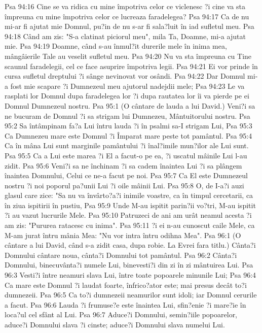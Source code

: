 Psa 94:16  Cine se va ridica cu mine împotriva celor ce viclenesc ?i cine va sta împreuna cu mine împotriva celor ce lucreaza faradelegea?
Psa 94:17  Ca de nu mi-ar fi ajutat mie Domnul, pu?in de nu s-ar fi sala?luit în iad sufletul meu.
Psa 94:18  Când am zis: "S-a clatinat piciorul meu", mila Ta, Doamne, mi-a ajutat mie.
Psa 94:19  Doamne, când s-au înmul?it durerile mele în inima mea, mângâierile Tale au veselit sufletul meu.
Psa 94:20  Nu va sta împreuna cu Tine scaunul faradelegii, cel ce face asuprire împotriva legii.
Psa 94:21  Ei vor prinde în cursa sufletul dreptului ?i sânge nevinovat vor osândi.
Psa 94:22  Dar Domnul mi-a fost mie scapare ?i Dumnezeul meu ajutorul nadejdii mele;
Psa 94:23  Le va rasplati lor Domnul dupa faradelegea lor ?i dupa rautatea lor îi va pierde pe ei Domnul Dumnezeul nostru.
Psa 95:1  (O cântare de lauda a lui David.) Veni?i sa ne bucuram de Domnul ?i sa strigam lui Dumnezeu, Mântuitorului nostru.
Psa 95:2  Sa întâmpinam fa?a Lui întru lauda ?i în psalmi sa-I strigam Lui,
Psa 95:3  Ca Dumnezeu mare este Domnul ?i Împarat mare peste tot pamântul.
Psa 95:4  Ca în mâna Lui sunt marginile pamântului ?i înal?imile mun?ilor ale Lui sunt.
Psa 95:5  Ca a Lui este marea ?i El a facut-o pe ea, ?i uscatul mâinile Lui l-au zidit.
Psa 95:6  Veni?i sa ne închinam ?i sa cadem înaintea Lui ?i sa plângem înaintea Domnului, Celui ce ne-a facut pe noi.
Psa 95:7  Ca El este Dumnezeul nostru ?i noi poporul pa?unii Lui ?i oile mâinii Lui.
Psa 95:8  O, de I-a?i auzi glasul care zice: "Sa nu va învârto?a?i inimile voastre, ca în timpul cercetarii, ca în ziua ispitirii în pustiu,
Psa 95:9  Unde M-au ispitit parin?ii vo?tri, M-au ispitit ?i au vazut lucrurile Mele.
Psa 95:10  Patruzeci de ani am urât neamul acesta ?i am zis: "Pururea ratacesc cu inima".
Psa 95:11  ?i ei n-au cunoscut caile Mele, ca M-am jurat întru mânia Mea: "Nu vor intra întru odihna Mea".
Psa 96:1  (O cântare a lui David, când s-a zidit casa, dupa robie. La Evrei fara titlu.) Cânta?i Domnului cântare noua, cânta?i Domnului tot pamântul.
Psa 96:2  Cânta?i Domnului, binecuvânta?i numele Lui, binevesti?i din zi în zi mântuirea Lui.
Psa 96:3  Vesti?i între neamuri slava Lui, între toate popoarele minunile Lui;
Psa 96:4  Ca mare este Domnul ?i laudat foarte, înfrico?ator este; mai presus decât to?i dumnezeii.
Psa 96:5  Ca to?i dumnezeii neamurilor sunt idoli; iar Domnul cerurile a facut.
Psa 96:6  Lauda ?i frumuse?e este înaintea Lui, sfin?enie ?i mare?ie în loca?ul cel sfânt al Lui.
Psa 96:7  Aduce?i Domnului, semin?iile popoarelor, aduce?i Domnului slava ?i cinste; aduce?i Domnului slava numelui Lui.
